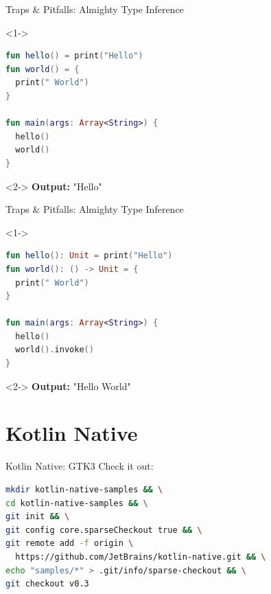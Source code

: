 \begin{frame}[fragile]{Traps \& Pitfalls: Almighty Type Inference}
	\begin{overlayarea}{\textwidth}{.6\textheight}
		\begin{onlyenv}<1->
\begin{lstlisting}[language=Kotlin]
fun hello() = print("Hello")
fun world() = {
  print(" World")
}

fun main(args: Array<String>) {
  hello()
  world()
}	
\end{lstlisting}
		\end{onlyenv}
		\begin{onlyenv}<2->
			\textbf{Output:} "Hello"
		\end{onlyenv}
	\end{overlayarea}
\end{frame}

\begin{frame}[fragile]{Traps \& Pitfalls: Almighty Type Inference}
	\begin{overlayarea}{\textwidth}{.6\textheight}
		\begin{onlyenv}<1->
\begin{lstlisting}[language=Kotlin]
fun hello(): Unit = print("Hello")
fun world(): () -> Unit = {
  print(" World")
}

fun main(args: Array<String>) {
  hello()
  world().invoke()
}
\end{lstlisting}
		\end{onlyenv}
		\begin{onlyenv}<2->
			\textbf{Output:} "Hello World"
		\end{onlyenv}
	\end{overlayarea}
\end{frame}

\section{Kotlin Native}

\begin{frame}[fragile]{Kotlin Native: GTK3}
	Check it out:\\\vspace{.5\baselineskip}
\begin{lstlisting}[language=bash,basicstyle=\ttfamily\small]
mkdir kotlin-native-samples && \
cd kotlin-native-samples && \
git init && \
git config core.sparseCheckout true && \
git remote add -f origin \
  https://github.com/JetBrains/kotlin-native.git && \
echo "samples/*" > .git/info/sparse-checkout && \
git checkout v0.3
\end{lstlisting}
\end{frame}

